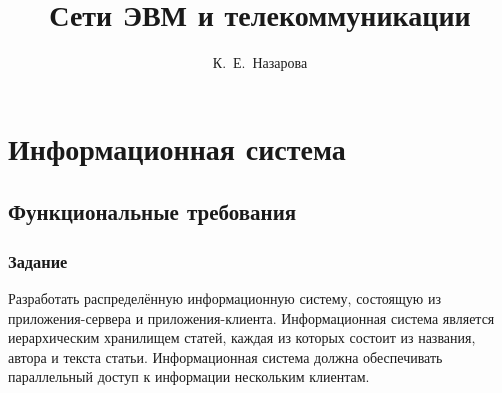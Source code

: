 \documentclass[12pt,a4paper]{report}
\author{К.~Е.~Назарова}
\title{Сети ЭВМ и телекоммуникации}
\begin{document}
\listoftodos
\maketitle
\chapter{Информационная система}
\section{Функциональные требования}
\subsection{Задание}
Разработать распределённую информационную систему, состоящую из приложения-сервера и приложения-клиента. Информационная система является иерархическим хранилищем статей, каждая из которых состоит из названия, автора и текста статьи. Информационная система должна обеспечивать параллельный доступ к информации нескольким клиентам.
\end{document}
